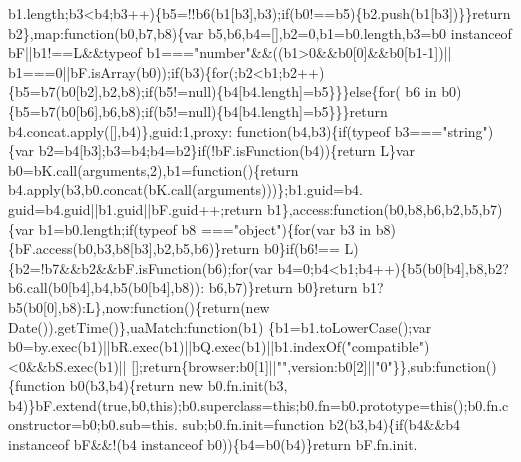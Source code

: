 \begin{DoxyCode}
      b1.length;b3<b4;b3++)\{b5=!!b6(b1[b3],b3);\textcolor{keywordflow}{if}(b0!==b5)\{b2.push(b1[b3])\}\}\textcolor{keywordflow}{return} b2\},map:\textcolor{keyword}{function}(b0,b7,b8)\{var 
      b5,b6,b4=[],b2=0,b1=b0.length,b3=b0 instanceof bF||b1!==L&&typeof b1===\textcolor{stringliteral}{"number"}&&((b1>0&&b0[0]&&b0[b1-1])||
      b1===0||bF.isArray(b0));\textcolor{keywordflow}{if}(b3)\{\textcolor{keywordflow}{for}(;b2<b1;b2++)\{b5=b7(b0[b2],b2,b8);\textcolor{keywordflow}{if}(b5!=null)\{b4[b4.length]=b5\}\}\}\textcolor{keywordflow}{else}\{\textcolor{keywordflow}{for}(
      b6 in b0)\{b5=b7(b0[b6],b6,b8);\textcolor{keywordflow}{if}(b5!=null)\{b4[b4.length]=b5\}\}\}\textcolor{keywordflow}{return} b4.concat.apply([],b4)\},guid:1,proxy:\textcolor{keyword}{
      function}(b4,b3)\{\textcolor{keywordflow}{if}(typeof b3===\textcolor{stringliteral}{"string"})\{var b2=b4[b3];b3=b4;b4=b2\}\textcolor{keywordflow}{if}(!bF.isFunction(b4))\{\textcolor{keywordflow}{return} 
      L\}var b0=bK.call(arguments,2),b1=\textcolor{keyword}{function}()\{\textcolor{keywordflow}{return} b4.apply(b3,b0.concat(bK.call(arguments)))\};b1.guid=b4.
      guid=b4.guid||b1.guid||bF.guid++;\textcolor{keywordflow}{return} b1\},access:\textcolor{keyword}{function}(b0,b8,b6,b2,b5,b7)\{var b1=b0.length;\textcolor{keywordflow}{if}(typeof b8
      ===\textcolor{stringliteral}{"object"})\{\textcolor{keywordflow}{for}(var b3 in b8)\{bF.access(b0,b3,b8[b3],b2,b5,b6)\}\textcolor{keywordflow}{return} b0\}\textcolor{keywordflow}{if}(b6!==
      L)\{b2=!b7&&b2&&bF.isFunction(b6);\textcolor{keywordflow}{for}(var b4=0;b4<b1;b4++)\{b5(b0[b4],b8,b2?b6.call(b0[b4],b4,b5(b0[b4],b8)):
      b6,b7)\}\textcolor{keywordflow}{return} b0\}\textcolor{keywordflow}{return} b1?b5(b0[0],b8):L\},now:function()\{\textcolor{keywordflow}{return}(\textcolor{keyword}{new} Date()).getTime()\},uaMatch:\textcolor{keyword}{function}(b1)
      \{b1=b1.toLowerCase();var b0=by.exec(b1)||bR.exec(b1)||bQ.exec(b1)||b1.indexOf(\textcolor{stringliteral}{"compatible"})<0&&bS.exec(b1)||
      [];\textcolor{keywordflow}{return}\{browser:b0[1]||\textcolor{stringliteral}{""},version:b0[2]||\textcolor{stringliteral}{"0"}\}\},sub:\textcolor{keyword}{function}()\{\textcolor{keyword}{function} b0(b3,b4)\{\textcolor{keywordflow}{return} \textcolor{keyword}{new} b0.fn.init(b3,
      b4)\}bF.extend(\textcolor{keyword}{true},b0,\textcolor{keyword}{this});b0.superclass=\textcolor{keyword}{this};b0.fn=b0.prototype=\textcolor{keyword}{this}();b0.fn.constructor=b0;b0.sub=this.
      sub;b0.fn.init=\textcolor{keyword}{function} b2(b3,b4)\{\textcolor{keywordflow}{if}(b4&&b4 instanceof bF&&!(b4 instanceof b0))\{b4=b0(b4)\}\textcolor{keywordflow}{return} bF.fn.init.

\end{DoxyCode}
